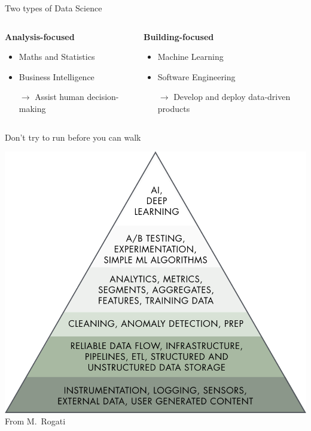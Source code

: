 \documentclass[12pt,aspectratio=169]{beamer}
\begin{document}
\begin{frame}{Two types of Data Science}
    \begin{columns}
        \begin{column}{0.5\textwidth}
            \begin{center}
                \large\bf%
                Analysis\hyp{}focused
            \end{center}
            \begin{itemize}
                \item Maths and Statistics
                \item Business Intelligence
                \item[$\to$] Assist human decision\hyp{}making
            \end{itemize}
        \end{column}
        \begin{column}{0.5\textwidth}
            \begin{center}
                \large\bf%
                Building\hyp{}focused
            \end{center}
            \begin{itemize}
                \item Machine Learning
                \item Software Engineering
                \item[$\to$] Develop and deploy data\hyp{}driven products
            \end{itemize}
        \end{column}
    \end{columns}
\end{frame}

\begin{frame}{Don't try to run before you can walk}
    \begin{center}
        \includegraphics[height=0.8\textheight]{figures/ai_hierarchy} \\
        {\scriptsize%
         From M.\ Rogati}
    \end{center}
\end{frame}
\end{document}
